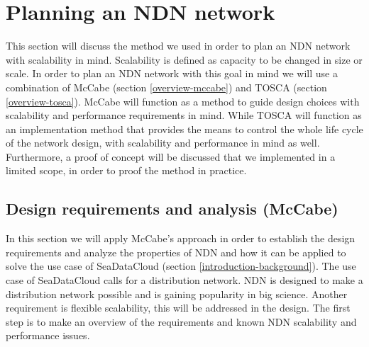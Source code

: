 \section{Planning an NDN network}
\label{planning-ndn}
This section will discuss the method we used in order to plan an NDN network with scalability in mind. Scalability is defined as capacity to be changed in size or scale. In order to plan an NDN network with this goal in mind we will use a combination of McCabe (section \ref{overview-mccabe}) and TOSCA (section \ref{overview-tosca}). McCabe will function as a method to guide design choices with scalability and performance requirements in mind. While TOSCA will function as an implementation method that provides the means to control the whole life cycle of the network design, with scalability and performance in mind as well. Furthermore, a proof of concept will be discussed that we implemented in a limited scope, in order to proof the method in practice.

\subsection{Design requirements and analysis (McCabe)}
\label{planning-requirements}
In this section we will apply McCabe's approach in order to establish the design requirements and analyze the properties of NDN and how it can be applied to solve the use case of SeaDataCloud (section \ref{introduction-background}). The use case of SeaDataCloud calls for a distribution network. NDN is designed to make a distribution network possible and is gaining popularity in big science. Another requirement is flexible scalability, this will be addressed in the design. The first step is to make an overview of the requirements and known NDN scalability and performance issues.

